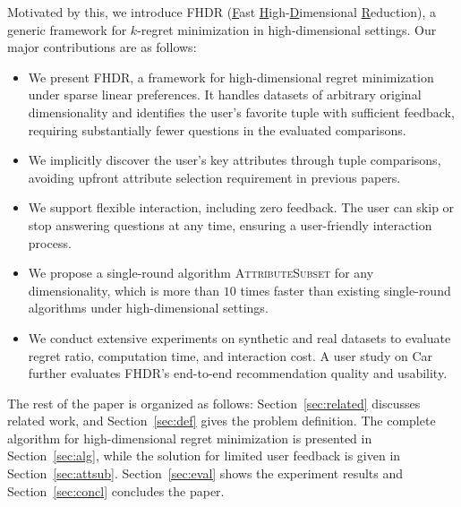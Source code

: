 Motivated by this, we introduce FHDR (\underline{F}ast \underline{H}igh-\underline{D}imensional \underline{R}eduction), a generic framework for $k$-regret minimization in high-dimensional settings. Our major contributions are as follows:
\begin{itemize}
    \item We present FHDR, a framework for high-dimensional regret minimization under sparse linear preferences. It handles datasets of arbitrary original dimensionality and identifies the user's favorite tuple with sufficient feedback, requiring substantially fewer questions in the evaluated comparisons.
    \item We implicitly discover the user's key attributes through tuple comparisons, avoiding upfront attribute selection requirement in previous papers.
    \item We support flexible interaction, including zero feedback. The user can skip or stop answering questions at any time, ensuring a user-friendly interaction process.
    \item We propose a single-round algorithm \textsc{AttributeSubset} for any dimensionality, which is more than $10$ times faster than existing single-round algorithms under high-dimensional settings.
    \item We conduct extensive experiments on synthetic and real datasets to evaluate regret ratio, computation time, and interaction cost. A user study on Car further evaluates FHDR's end-to-end recommendation quality and usability.
\end{itemize}

The rest of the paper is organized as follows: Section~\ref{sec:related} discusses related work, and Section~\ref{sec:def} gives the problem definition. The complete algorithm for high-dimensional regret minimization is presented in Section~\ref{sec:alg}, while the solution for limited user feedback is given in Section~\ref{sec:attsub}. Section~\ref{sec:eval} shows the experiment results and Section~\ref{sec:concl} concludes the paper.

